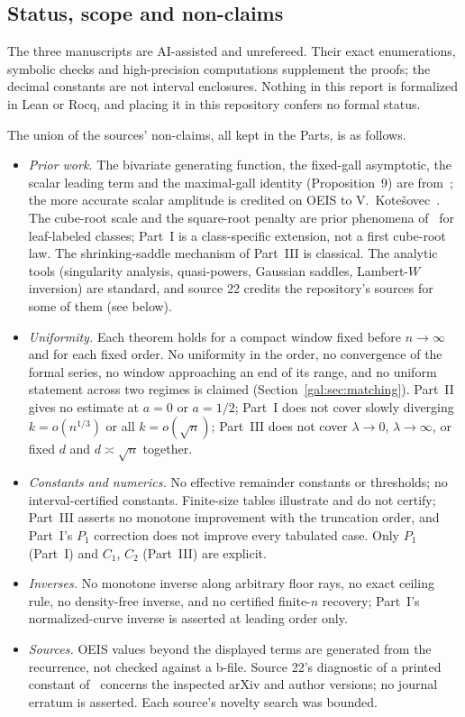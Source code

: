 \documentclass[11pt,letterpaper]{article}
\numberwithin{equation}{section}
\theoremstyle{definition}\newtheorem{definition}[theorem]{Definition}
\theoremstyle{remark}\newtheorem{remark}[theorem]{Remark}
\begin{document}
\subsection*{Status, scope and non-claims}
\label{gal:guide:status}
The three manuscripts are AI-assisted and unrefereed. Their exact enumerations, symbolic checks and high-precision computations supplement the proofs; the decimal constants are not interval enclosures. Nothing in this report is formalized in Lean or Rocq, and placing it in this repository confers no formal status.

The union of the sources' non-claims, all kept in the Parts, is as follows.
\begin{itemize}
\item \emph{Prior work.} The bivariate generating function, the fixed-gall asymptotic, the scalar leading term and the maximal-gall identity (Proposition~9) are from~\cite{comparison}; the more accurate scalar amplitude is credited on OEIS to V.~Kote\v{s}ovec~\cite{oeis397952}. The cube-root scale and the square-root penalty are prior phenomena of~\cite{fuchs-yu} for leaf-labeled classes; Part~I is a class-specific extension, not a first cube-root law. The shrinking-saddle mechanism of Part~III is classical. The analytic tools (singularity analysis, quasi-powers, Gaussian saddles, Lambert-$W$ inversion) are standard, and source 22 credits the repository's sources for some of them (see below).
\item \emph{Uniformity.} Each theorem holds for a compact window fixed before $n\to\infty$ and for each fixed order. No uniformity in the order, no convergence of the formal series, no window approaching an end of its range, and no uniform statement across two regimes is claimed (Section~\ref{gal:sec:matching}). Part~II gives no estimate at $a=0$ or $a=1/2$; Part~I does not cover slowly diverging $k=o(n^{1/3})$ or all $k=o(\sqrt n)$; Part~III does not cover $\lambda\to0$, $\lambda\to\infty$, or fixed $d$ and $d\asymp\sqrt n$ together.
\item \emph{Constants and numerics.} No effective remainder constants or thresholds; no interval-certified constants. Finite-size tables illustrate and do not certify; Part~III asserts no monotone improvement with the truncation order, and Part~I's $P_1$ correction does not improve every tabulated case. Only $P_1$ (Part~I) and $C_1$, $C_2$ (Part~III) are explicit.
\item \emph{Inverses.} No monotone inverse along arbitrary floor rays, no exact ceiling rule, no density-free inverse, and no certified finite-$n$ recovery; Part~I's normalized-curve inverse is asserted at leading order only.
\item \emph{Sources.} OEIS values beyond the displayed terms are generated from the recurrence, not checked against a b-file. Source 22's diagnostic of a printed constant of~\cite{comparison} concerns the inspected arXiv and author versions; no journal erratum is asserted. Each source's novelty search was bounded.
\end{itemize}
\end{document}
